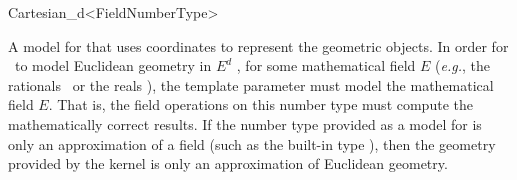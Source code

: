 \begin{ccRefClass}{Cartesian_d<FieldNumberType>}


\ccDefinition
A model for  that uses  coordinates to represent the
geometric objects.  In order for \ccRefName\ to model Euclidean geometry
in $E^d$ , for some mathematical field $E$ (\textit{e.g.},
the rationals \Q\ or the reals \R), the template parameter  
must model the mathematical field $E$.  That is, the field operations on this
number type must compute the mathematically correct results.  If the number 
type provided as a model for  is only an approximation of a 
field (such as the built-in type ), then the geometry provided by 
the kernel is only an approximation of Euclidean geometry.  

\ccIsModel
{}

\ccSeeAlso
{}


\end{ccRefClass}

